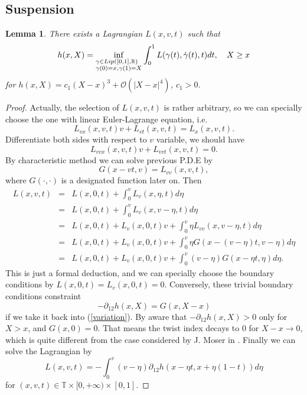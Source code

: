 \documentclass{amsart}
\newtheorem{lem}[thm]{Lemma}
\begin{document}
\subsection{Suspension}

\begin{lem}\label{suspension}
There exists a Lagrangian $L(x,v,t)$ such that 
\begin{equation}\label{variation}
h(x,X)=\inf_{\begin{subarray}{1}
\gamma\in Lip([0,1],{\mathbb{R}})\\\gamma(0)=x,\gamma(1)=X
\end{subarray}
}\int_0^1L(\gamma(t),\dot\gamma(t),t)dt, \quad X\geq x
\end{equation}
for $h(x,X)=c_1(X-x)^3+{\mathcal{O}}(|X-x|^4)$, $c_1>0$.
\end{lem}
\begin{proof}
Actually, the selection of $L(x,v,t)$ is rather arbitrary, so we can specially choose the one with linear Euler-Lagrange equation, i.e.
\[
L_{vx}(x,v,t)v+L_{vt}(x,v,t)=L_x(x,v,t).
\]
Differentiate both sides with respect to $v$ variable, we should have
\[
L_{vvx}(x,v,t)v+L_{vvt}(x,v,t)=0.
\]
By characteristic method we can solve previous P.D.E by
\[
G(x-vt,v)=L_{vv}(x,v,t),
\]
where $G(\cdot,\cdot)$ is a designated function later on. Then
\begin{eqnarray*}
L(x,v,t)&=&L(x,0,t)+\int_0^vL_v(x,\eta,t)d\eta\\
&=&L(x,0,t)+\int_0^vL_v(x,v-\eta,t)d\eta\\
&=&L(x,0,t)+L_v(x,0,t)v+\int_0^v\eta L_{vv}(x,v-\eta,t)d\eta\\
&=&L(x,0,t)+L_v(x,0,t)v+\int_0^v\eta G(x-(v-\eta)t,v-\eta)d\eta\\
&=&L(x,0,t)+L_v(x,0,t)v+\int_0^v(v-\eta)G(x-\eta t,\eta)d\eta.
\end{eqnarray*}
This is just a formal deduction, and we can specially choose the boundary conditions by $L(x,0,t)=L_v(x,0,t)=0$. Conversely, these trivial boundary conditions constraint
\begin{equation}\label{twist}
-\partial_{12}h(x,X)=G(x,X-x)
\end{equation}
if we take it back into (\ref{variation}). By aware that $-\partial_{12}h(x,X)>0$ only for $X>x$, and $G(x,0)=0$. That means the twist index decays to $0$ for $X-x\rightarrow 0$, which is quite different from the case considered by J. Moser in \cite{M}. 
Finally we can solve the Lagrangian by
\[
L(x,v,t)=-\int_0^v(v-\eta)\partial_{12}h(x-\eta t,x+\eta(1-t))d\eta
\]
for $(x,v,t)\in{\mathbb{T}}\times[0,+\infty)\times[0,1]$. 
\end{proof}
\end{document}
